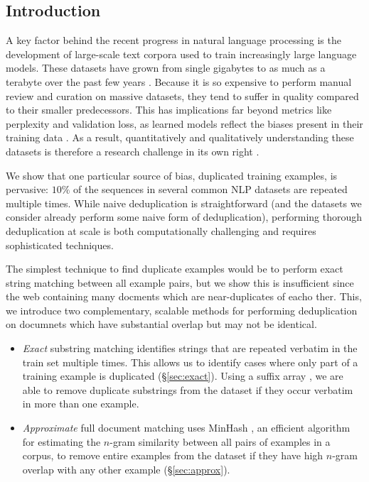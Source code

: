 \subsection{Introduction}
A key factor behind the recent progress in natural language processing is the development of large-scale text corpora used to train increasingly large language models.
These datasets have grown from single gigabytes to as much as a terabyte over the past few years \citep{chelba2013one,xue2020mt5,graff2003english,brown2020language}.
%
Because it is so expensive to perform manual review and curation on massive datasets, they tend to suffer in quality compared to their smaller predecessors.
This has implications far beyond metrics like perplexity and validation loss, as learned models reflect the biases present in their training data \cite{bender2021stochastic,wallace2019universal,sheng2020towards}.
As a result, quantitatively and qualitatively understanding these datasets is therefore a research challenge in its own right \cite{dodge2021documenting}.


We show that one particular source of bias,
duplicated training examples, is pervasive:
$10\%$ of the sequences in several common NLP datasets are repeated multiple times.
While naive deduplication is straightforward
(and the datasets we consider already perform some naive form
of deduplication), performing thorough deduplication at scale is both computationally challenging and requires sophisticated techniques.

The simplest technique to find duplicate examples would be to perform exact string matching between all example pairs, but we show this is insufficient since the web containing many docments which are near-duplicates of eacho ther.
This, we introduce two complementary, scalable methods for performing deduplication on documnets which have substantial overlap but may not be identical.
\begin{itemize}
    \item
\textit{Exact} substring matching identifies strings that are repeated verbatim in the train set multiple times.
This allows us to identify cases where only part of a training example is duplicated (\S\ref{sec:exact}).
Using a suffix array \cite{manber1993suffix}, we are able to remove duplicate substrings from the dataset if they occur verbatim in more than one example.
    \item
\textit{Approximate} full document matching uses  MinHash \citep{broder1997resemblance}, an efficient algorithm for estimating the $n$-gram similarity between all pairs of examples in a corpus, to remove entire examples from the dataset if they have high $n$-gram overlap with any other example (\S\ref{sec:approx}).
\end{itemize}

